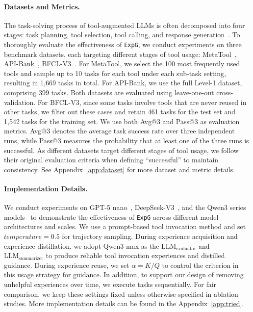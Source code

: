 \documentclass[11pt]{article}
\newcommand{\ours}{\texttt{ExpG}}
\begin{document}
\paragraph{Datasets and Metrics.} %
The task-solving process of tool-augmented LLMs is often decomposed into four stages: task planning, tool selection, tool calling, and response generation~\cite{toolsurvey}.
To thoroughly evaluate the effectiveness of {\ours}, we conduct experiments on three benchmark datasets, each targeting different stages of tool usage: MetaTool~\cite{metatool}, API-Bank~\cite{apibank}, BFCL-V3~\citep{patilberkeley}. 
For MetaTool, we select the 100 most frequently used tools and sample up to 10 tasks for each tool under each sub-task setting, resulting in 1,669 tasks in total. For API-Bank, we use the full Level-1 dataset, comprising 399 tasks. Both datasets are evaluated using leave-one-out cross-validation. For BFCL-V3, since some tasks involve tools that are never reused in other tasks, we filter out these cases and retain 461 tasks for the test set and 1,542 tasks for the training set. 
We use both Avg@3 and Pass@3 as evaluation metrics. Avg@3 denotes the average task success rate over three independent runs, while Pass@3 measures the probability that at least one of the three runs is successful. As different datasets target different stages of tool usage, we follow their original evaluation criteria when defining ``successful'' to maintain consistency. See Appendix~\ref{app:dataset} for more dataset and metric details.

\paragraph{Implementation Details.} 
We conduct experiments on GPT-5 nano~\cite{openai2025gpt5}, DeepSeek-V3~\cite{deepseekai2025deepseekv3technicalreport}, and the Qwen3 series models~\citep{qwen3technicalreport} to demonstrate the effectiveness of {\ours} across different model architectures and scales. We use a prompt-based tool invocation method and set $temperature =0.5$ for trajectory sampling. 
During experience acquisition and experience distillation, we adopt Qwen3-max as the $\mathrm{LLM}_{\mathrm{evaluator}}$ and $\mathrm{LLM}_{\mathrm{summarizer}}$ to produce reliable tool invocation experiences and distilled guidance. 
During experience reuse, we set $\alpha=K/Q$ to control the criterion in this usage strategy for guidance. 
In addition, to support our design of removing unhelpful experiences over time, we execute tasks sequentially. 
For fair comparison, we keep these settings fixed unless otherwise specified in ablation studies. 
More implementation details can be found in the Appendix~\ref{app:tried}. 
\end{document}
